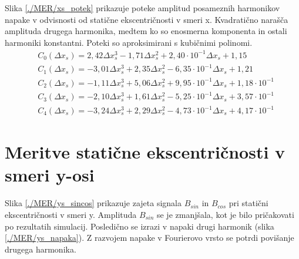 Slika \ref{./MER/xs_potek} prikazuje poteke amplitud posameznih harmonikov napake v odvisnosti od statične ekscentričnosti v smeri x. Kvadratično narašča amplituda drugega harmonika, medtem ko so enosmerna komponenta in ostali harmoniki konstantni. Poteki so aproksimirani s kubičnimi polinomi.
\begin{eqnarray}
&C_0(\Delta x_s) =2,42\Delta x_s^{3}-1,71\Delta x_s^{2}+2,40\cdot 10^{-1}\Delta x_s+1,15 \\              
&C_1(\Delta x_s) =-3,01\Delta x_s^{3}+2,35\Delta x_s^{2}-6,35\cdot 10^{-1}\Delta x_s+1,21 \\             
&C_2(\Delta x_s) =-1,11\Delta x_s^{3}+5,06\Delta x_s^{2}+9,95\cdot 10^{-1}\Delta x_s+1,18\cdot 10^{-1} \\
&C_3(\Delta x_s) =-2,10\Delta x_s^{3}+1,61\Delta x_s^{2}-5,25\cdot 10^{-1}\Delta x_s+3,57\cdot 10^{-1} \\
&C_4(\Delta x_s) =-3,24\Delta x_s^{3}+2,29\Delta x_s^{2}-4,73\cdot 10^{-1}\Delta x_s+4,17\cdot 10^{-1}
\end{eqnarray}
\section{Meritve statične ekscentričnosti v smeri y-osi}
Slika \ref{./MER/ys_sincos} prikazuje zajeta signala $B_{sin}$ in $B_{cos}$ pri statični ekscentričnosti v smeri y. Amplituda $B_{sin}$ se je zmanjšala, kot je bilo pričakovati po rezultatih simulacij. Posledično se izrazi v napaki drugi harmonik (slika \ref{./MER/ys_napaka}). Z razvojem napake v Fourierovo vrsto se potrdi povišanje drugega harmonika.
\newpage
